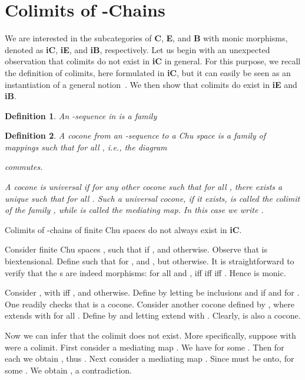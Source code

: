 \documentclass{LMCS}
\let\pf\proof
\let\epf\endproof
\newtheorem{defn}{Definition}[section]
\begin{document}
\section{Colimits of -Chains}

\noindent We are interested in the subcategories of {\bf C}, {\bf E},
and {\bf B} with monic morphisms, denoted as {\bf iC}, {\bf iE}, and
{\bf iB}, respectively.  Let us begin with an unexpected observation
that colimits do not exist in {\bf iC} in general.  For this purpose,
we recall the definition of colimits, here formulated in {\bf iC}, but
it can easily be seen as an instantiation of a general
notion~\cite{maclane}.  We then show that colimits do exist in {\bf
  iE} and {\bf iB}.

\begin{defn}
An -sequence in   is a family 

\end{defn}



\begin{defn}\label{cocone}
  A cocone from an -sequence 
  to a Chu space  is a family of mappings  such that  for all , i.e., the diagram


commutes.

A cocone  is universal if
for any other cocone 
such that  for all
, there exists a unique  such
that  for all .  Such a
universal cocone, if it exists, is called the colimit of the family , while  is called the mediating
map. In this case we write .
\end{defn}

\begin{thm}\label{non-existence}
Colimits of -chains of finite Chu spaces do not always exist in  {\bf iC}.
\end{thm}

\pf Consider finite Chu spaces , such that  if , and  otherwise. Observe that  is biextensional.  Define
 such that 
for , and , but  otherwise.   It is
straightforward to verify that the s are indeed morphisms: for
all  and ,
 iff  iff  iff
. Hence  is monic.

Consider , with 
iff , and  otherwise. Define  by letting  be inclusions and  if  and  for .  One readily
checks that  is a cocone.
Consider another cocone defined by , where  extends  with  for
all . Define  by
 and letting  extend
 with .  Clearly,  is also a cocone.

Now we can infer that the colimit does not exist. More specifically,
suppose  with  were a colimit.  First consider a mediating
map .  We have 
for some . Then for each  we obtain , thus . Next consider a mediating map .  Since  must be onto,  for some . We obtain
, a contradiction.
\epf
\end{document}
